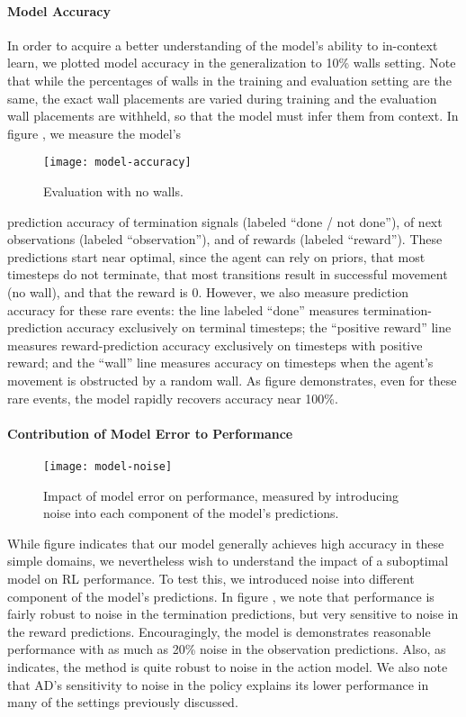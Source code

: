 \paragraph{Model Accuracy}
In order to acquire a better understanding of the model's ability to in-context
learn, we plotted model accuracy in the generalization to 10\% walls setting.
Note that while the percentages of walls in the training and evaluation setting
are the same, the exact wall placements are varied during training and the
evaluation wall placements are withheld, so that the model must infer them from
context. In figure , we measure the model's
\begin{wrapfigure}{l}{0.6\textwidth}
    \texttt{[image: model-accuracy]}
    \caption{Evaluation with no walls.}
\end{wrapfigure}
prediction accuracy of termination signals (labeled ``done / not done''), of
next observations (labeled ``observation''), and of rewards (labeled
``reward''). These predictions start near optimal, since the agent can rely on
priors, that most timesteps do not terminate, that most transitions result in
successful movement (no wall), and that the reward is 0. However, we also
measure prediction accuracy for these rare events: the line labeled ``done''
measures termination-prediction accuracy exclusively on terminal timesteps; the
``positive reward'' line measures reward-prediction accuracy exclusively on
timesteps with positive reward; and the ``wall'' line measures accuracy on
timesteps when the agent's movement is obstructed by a random wall. As figure
 demonstrates, even for these rare events, the
model rapidly recovers accuracy near 100\%.

\paragraph{Contribution of Model Error to Performance}
\begin{figure}[b]
    \centering
    \texttt{[image: model-noise]}
    \caption{Impact of model error on performance, measured by introducing noise
        into each component of the model's predictions.}
\end{figure}
While figure  indicates that our model generally
achieves high accuracy in these simple domains, we nevertheless wish to
understand the impact of a suboptimal model on RL performance. To test this, we
introduced noise into different component of the model's predictions. In figure
, we note that performance is fairly robust to noise
in the termination predictions, but very sensitive to noise in the reward
predictions. Encouragingly, the model is demonstrates reasonable performance
with as much as 20\% noise in the observation predictions. Also, as
 indicates, the method is quite robust to noise in
the action model. We also note that AD's sensitivity to noise in the policy
explains its lower performance in many of the settings previously discussed.

